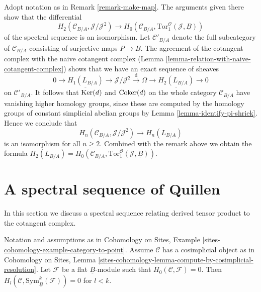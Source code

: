 \begin{remark}
\label{remark-surjection}
Adopt notation as in Remark \ref{remark-make-map}. The arguments given
there show that the differential
$$
H_2(\mathcal{C}_{B/A}, \mathcal{J}/\mathcal{J}^2)
\longrightarrow
H_0(\mathcal{C}_{B/A}, \text{Tor}_1^\mathcal{O}(\mathcal{J}, \underline{B}))
$$
of the spectral sequence is an isomorphism. Let $\mathcal{C}'_{B/A}$
denote the full subcategory of $\mathcal{C}_{B/A}$ consisting of surjective
maps $P \to B$. The agreement of the cotangent complex with the naive
cotangent complex (Lemma \ref{lemma-relation-with-naive-cotangent-complex})
shows that we have an exact sequence of sheaves
$$
0 \to \underline{H_1(L_{B/A})} \to
\mathcal{J}/\mathcal{J}^2 \xrightarrow{\text{d}} \Omega \to
\underline{H_2(L_{B/A})} \to 0
$$
on $\mathcal{C}'_{B/A}$. It follows that $\mathop{\mathrm{Ker}}(d)$ and
$\mathop{\mathrm{Coker}}(d)$ on the whole category $\mathcal{C}_{B/A}$ have
vanishing higher homology groups, since
these are computed by the homology groups of constant simplicial abelian
groups by Lemma \ref{lemma-identify-pi-shriek}. Hence we conclude
that
$$
H_n(\mathcal{C}_{B/A}, \mathcal{J}/\mathcal{J}^2) \to H_n(L_{B/A})
$$
is an isomorphism for all $n \geq 2$. Combined with the remark above
we obtain the formula
$H_2(L_{B/A}) =
H_0(\mathcal{C}_{B/A}, \text{Tor}_1^\mathcal{O}(\mathcal{J}, \underline{B}))$.
\end{remark}





\section{A spectral sequence of Quillen}
\label{section-spectral-sequence}

\noindent
In this section we discuss a spectral sequence relating derived
tensor product to the cotangent complex.

\begin{lemma}
\label{lemma-vanishing-symmetric-powers}
Notation and assumptions as in
Cohomology on Sites, Example \ref{sites-cohomology-example-category-to-point}.
Assume $\mathcal{C}$ has a cosimplicial object as in
Cohomology on Sites, Lemma
\ref{sites-cohomology-lemma-compute-by-cosimplicial-resolution}.
Let $\mathcal{F}$ be a flat $\underline{B}$-module such that
$H_0(\mathcal{C}, \mathcal{F}) = 0$.
Then $H_l(\mathcal{C}, \text{Sym}_{\underline{B}}^k(\mathcal{F})) = 0$
for $l < k$.
\end{lemma}

